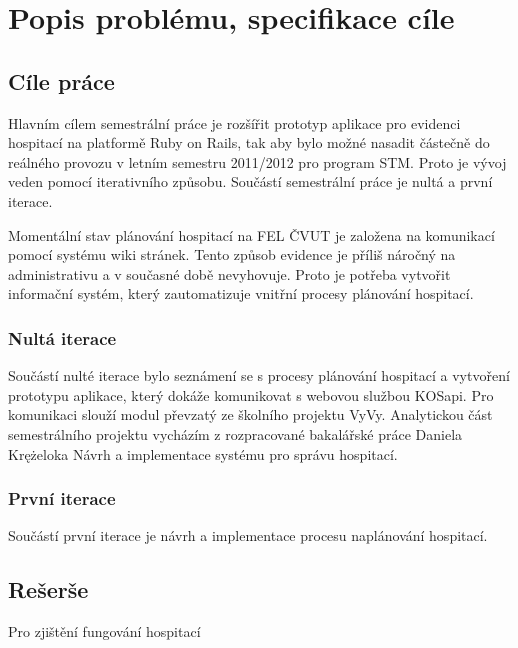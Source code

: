 \chapter{Popis problému, specifikace cíle}
\section{Cíle práce}
Hlavním cílem semestrální práce je rozšířit prototyp aplikace pro evidenci hospitací na platformě Ruby on Rails, tak aby bylo možné nasadit částečně do reálného provozu v letním semestru 2011/2012 pro program STM. Proto je vývoj veden pomocí iterativního způsobu. Součástí semestrální práce je nultá a první iterace.

Momentální stav plánování hospitací na FEL ČVUT je založena na komunikací pomocí systému wiki stránek. Tento způsob evidence je příliš náročný na administrativu a v současné době nevyhovuje. Proto je potřeba vytvořit informační systém, který zautomatizuje vnitřní procesy plánování hospitací. 

\subsection{Nultá iterace}
Součástí nulté iterace bylo seznámení se s procesy plánování hospitací a vytvoření prototypu aplikace, který dokáže komunikovat s webovou službou KOSapi. Pro komunikaci slouží modul převzatý ze školního projektu VyVy. 
Analytickou část semestrálního projektu vycházím z rozpracované bakalářské práce Daniela Krężeloka Návrh a implementace systému pro správu hospitací.
 
\subsection{První iterace}
Součástí první iterace je návrh a implementace procesu naplánování hospitací. 

\section{Rešerše}
Pro zjištění fungování hospitací 

